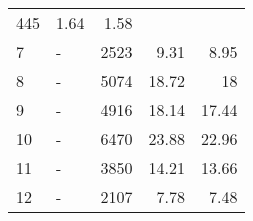 \begin{longtable}{lXrrr}
       \num{445} &
       \num[round-mode=places,round-precision=2]{1.64} &
         \num[round-mode=places,round-precision=2]{1.58} \\

     7 &
     \multicolumn{1}{X}{ -  } &


       \num{2523} &
       \num[round-mode=places,round-precision=2]{9.31} &
         \num[round-mode=places,round-precision=2]{8.95} \\

     8 &
     \multicolumn{1}{X}{ -  } &


       \num{5074} &
       \num[round-mode=places,round-precision=2]{18.72} &
         \num[round-mode=places,round-precision=2]{18} \\

     9 &
     \multicolumn{1}{X}{ -  } &


       \num{4916} &
       \num[round-mode=places,round-precision=2]{18.14} &
         \num[round-mode=places,round-precision=2]{17.44} \\

     10 &
     \multicolumn{1}{X}{ -  } &


       \num{6470} &
       \num[round-mode=places,round-precision=2]{23.88} &
         \num[round-mode=places,round-precision=2]{22.96} \\

     11 &
     \multicolumn{1}{X}{ -  } &


       \num{3850} &
       \num[round-mode=places,round-precision=2]{14.21} &
         \num[round-mode=places,round-precision=2]{13.66} \\

     12 &
     \multicolumn{1}{X}{ -  } &


       \num{2107} &
       \num[round-mode=places,round-precision=2]{7.78} &
         \num[round-mode=places,round-precision=2]{7.48} \\


\end{longtable}
